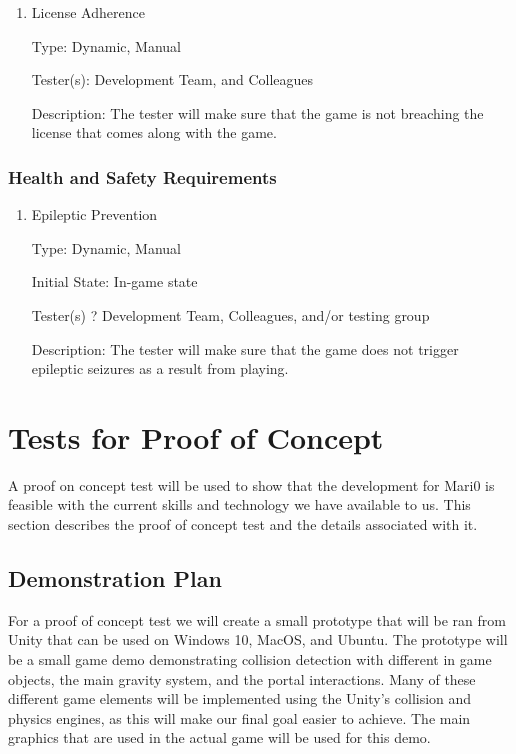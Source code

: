 \documentclass[12pt, titlepage]{article}
\begin{document}
\begin{enumerate}

\item{License Adherence\\}

Type: Dynamic, Manual

Tester(s): Development Team, and Colleagues

Description: The tester will make sure that the game is not breaching the license that comes along with the game.

\end{enumerate}

\subsubsection{Health and Safety Requirements}

\begin{enumerate}

\item{Epileptic Prevention\\}

Type: Dynamic, Manual

Initial State: In-game state

Tester(s) ? Development Team, Colleagues, and/or testing group

Description: The tester will make sure that the game does not trigger epileptic seizures as a result from playing.

\end{enumerate}

\section{Tests for Proof of Concept}

A proof on concept test will be used to show that the development for Mari0 is feasible with the current skills and technology we have available to us. This section describes the proof of concept test and the details associated with it.

\subsection{Demonstration Plan}
For a proof of concept test we will create a small prototype that will be ran from Unity that can be used on Windows 10, MacOS, and Ubuntu. The prototype will be a small game demo demonstrating collision detection with different in game objects, the main gravity system, and the portal interactions. Many of these different game elements will be implemented using the Unity's collision and physics engines, as this will make our final goal easier to achieve. The main  graphics that are used in the actual game will be used for this demo.
\end{document}
